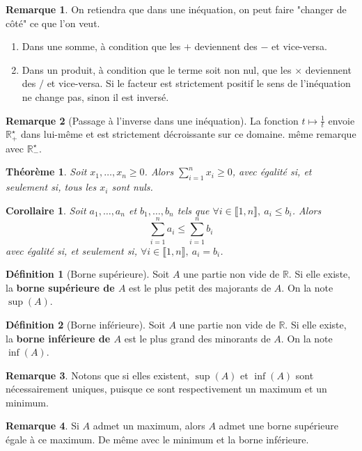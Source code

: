 \documentclass[french]{book}
\newcommand{\R}{\mathbb{R}}
\newcommand{\st}{^\star}
\theoremstyle{plain}
\newtheorem{thm}{Théorème}[chapter]
\newtheorem{cor}{Corollaire}[chapter]
\theoremstyle{definition}
\newtheorem{dfn}{Définition}[chapter]
\newtheorem{rmq}{Remarque}[chapter]
\theoremstyle{remark}
\begin{document}
\begin{rmq}
	On retiendra que dans une inéquation, on peut faire "changer de côté" ce que l'on veut.
	\begin{enumerate}
		\item Dans une somme, à condition que les $+$ deviennent des $-$ et vice-versa.
		\item Dans un produit, à condition que le terme soit non nul, que les $\times$ deviennent des $/$ et vice-versa. Si le facteur est strictement positif le sens de l'inéquation ne change pas, sinon il est inversé.
	\end{enumerate}
\end{rmq}
\begin{rmq}[Passage à l'inverse dans une inéquation]
	La fonction $\displaystyle t\mapsto\frac{1}{t}$ envoie $\R_+\st$ dans lui-même et est strictement décroissante sur ce domaine. même remarque avec $\R_-\st$.
\end{rmq}
\begin{thm}
	Soit $x_1,\ldots,x_n\geqslant0$. Alors $\displaystyle\sum_{i=1}^{n}x_i\geqslant0$, avec égalité si, et seulement si, tous les $x_i$ sont nuls.
\end{thm}
\begin{cor}
	Soit $a_1,\ldots,a_n$ et $b_1,\ldots,b_n$ tels que $\forall i\in\llbracket1,n\rrbracket,\ a_i\leqslant b_i$. Alors $$\sum_{i=1}^{n}a_i\leqslant\sum_{i=1}^{n}b_i$$ avec égalité si, et seulement si, $\forall i\in\llbracket1,n\rrbracket,\ a_i=b_i$.
\end{cor}
\begin{dfn}[Borne supérieure]
	Soit $A$ une partie non vide de $\R$. Si elle existe, la \textbf{borne supérieure de $A$} est le plus petit des majorants de $A$. On la note $\sup(A)$.
\end{dfn}
\begin{dfn}[Borne inférieure]
	Soit $A$ une partie non vide de $\R$. Si elle existe, la \textbf{borne inférieure de $A$} est le plus grand des minorants de $A$. On la note $\inf(A)$.
\end{dfn}
\begin{rmq}
	Notons que si elles existent, $\sup(A)$ et $\inf(A)$ sont nécessairement uniques, puisque ce sont respectivement un maximum et un minimum.
\end{rmq}
\begin{rmq}
	Si $A$ admet un maximum, alors $A$ admet une borne supérieure égale à ce maximum. De même avec le minimum et la borne inférieure.
\end{rmq}
\end{document}
